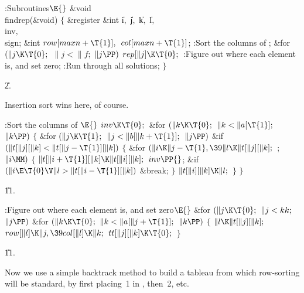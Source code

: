 \Y\B\4:Subroutines\X${}\E{}$\6
\&{void} \\{findrep}(\&{void})\6
${}\{{}$\1\6
\&{register} \&{int} \|i${},{}$ \|j${},{}$ \|k${},{}$ \|l${},{}$ \\{inv}${},{}$
\\{sign};\6
\&{int} ${}\\{row}[\\{maxn}+\T{1}],{}$ ${}\\{col}[\\{maxn}+\T{1}]{}$;\7
:Sort the columns of \X;\6
\&{for} ${}(\|j\K\T{0};{}$ ${}\|j<\|f;{}$ ${}\|j\PP){}$\1\5
${}\\{rep}[\|j]\K\T{0};{}$\2\6
:Figure out where each element is, and set  zero\X;\6
:Run through all solutions\X;\6
\4${}\}{}$\2\par
\U2.\fi

Insertion sort wins here, of course.

\Y\B\4:Sort the columns of \X${}\E{}$\6
$\\{inv}\K\T{0};{}$\6
\&{for} ${}(\|k\K\T{0};{}$ ${}\|k<\|a[\T{1}];{}$ ${}\|k\PP){}$\5
${}\{{}$\1\6
\&{for} ${}(\|j\K\T{1};{}$ ${}\|j<\|b[\|k+\T{1}];{}$ ${}\|j\PP){}$\1\6
\&{if} ${}(\|t[\|j][\|k]<\|t[\|j-\T{1}][\|k]){}$\5
${}\{{}$\1\6
\&{for} ${}(\|i\K\|j-\T{1},\39\|l\K\|t[\|j][\|k];{}$  ; ${}\|i\MM){}$\5
${}\{{}$\1\6
${}\|t[\|i+\T{1}][\|k]\K\|t[\|i][\|k];{}$\6
${}\\{inv}\PP{}$;\6
\&{if} ${}(\|i\E\T{0}\V\|l>\|t[\|i-\T{1}][\|k]){}$\1\5
\&{break};\2\6
\4${}\}{}$\2\6
${}\|t[\|i][\|k]\K\|l;{}$\6
\4${}\}{}$\2\2\6
\4${}\}{}$\2\par
\U11.\fi

\B{}:Figure out where each element is, and set  zero\X${}%
\E{}$\6
\&{for} ${}(\|j\K\T{0};{}$ ${}\|j<\\{kk};{}$ ${}\|j\PP){}$\1\6
\&{for} ${}(\|k\K\T{0};{}$ ${}\|k<\|a[\|j+\T{1}];{}$ ${}\|k\PP){}$\5
${}\{{}$\1\6
${}\|l\K\|t[\|j][\|k];{}$\6
${}\\{row}[\|l]\K\|j,\39\\{col}[\|l]\K\|k;{}$\6
${}\\{tt}[\|j][\|k]\K\T{0};{}$\6
\4${}\}{}$\2\2\par
\U11.\fi

Now we use a simple backtrack method to build a tableau  from
which
row-sorting will be standard, by first placing~1 in , then~2, etc.

